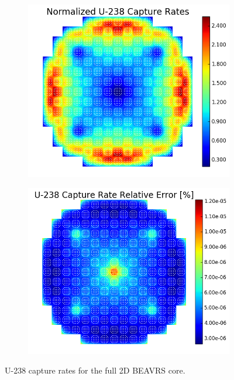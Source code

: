 \begin{figure}[h!]
\centering
\begin{subfigure}{0.5\textwidth}
  \centering
  \includegraphics[width=\linewidth]{figures/benchmarks/capture-rates/capt-mean-full-core}
  \caption{}
  \label{fig:chap7-capt-rate-mean-full-core}
\end{subfigure}%
\begin{subfigure}{0.5\textwidth}
  \centering
  \includegraphics[width=\linewidth]{figures/benchmarks/capture-rates/capt-rel-err-full-core}
  \caption{}
  \label{fig:chap7-capt-rate-rel-err-full-core}
\end{subfigure}%
\caption[U-238 capture rates for the full 2D BEAVRS core]{U-238 capture rates for the full 2D \ac{BEAVRS} core.}
\label{fig:chap7-capt-rates-full-coe}
\end{figure}

